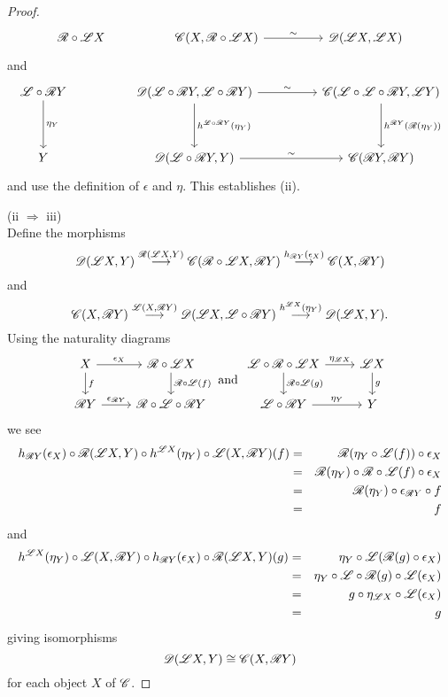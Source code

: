 \documentclass[10pt]{amsart}
\begin{document}
\begin{prop}
\begin{proof}
$$\begin{tikzcd}
      \RA \circ \LA X & & \C(X, \RA \circ \LA X) \arrow{rr}{\sim} & & \D(\LA X, \LA X)
    \end{tikzcd}$$
    and
    $$\begin{tikzcd}
      \LA \circ \RA Y \arrow{dd}{\eta_Y} & & \D(\LA \circ \RA Y, \LA \circ \RA Y) \arrow{rr}{\sim}\arrow{dd}{h^{\LA \circ \RA Y}(\eta_Y)} & & \C(\LA \circ \LA \circ \RA Y, \LA Y) \arrow{dd}{h^{\RA Y}(\RA(\eta_Y))}\\
      \\
      Y & & \D(\LA \circ \RA Y, Y) \arrow{rr}{\sim}  & & \C(\RA Y, \RA Y)
    \end{tikzcd}$$
    and use the definition of $\epsilon$ and $\eta$.
    This establishes (ii).
    
    (ii $\Rightarrow$ iii)\\
    Define the morphisms
    $$\mathscr{D}(\mathscr{L} X, Y) \overset{\mathscr{R}(\mathscr{L} X, Y)}\longrightarrow \mathscr{C}(\mathscr{R} \circ \mathscr{L} X, \mathscr{R} Y) \overset{h_{\mathscr{R} Y}(\epsilon_X)}\longrightarrow \mathscr{C}(X, \mathscr{R} Y)$$
    and
    $$\mathscr{C}(X, \mathscr{R} Y) \overset{\mathscr{L}(X, \mathscr{R} Y)}\longrightarrow \mathscr{D}(\mathscr{L} X, \mathscr{L} \circ \mathscr{R} Y) \overset{h^{\mathscr{L} X}(\eta_Y)}\longrightarrow \mathscr{D}(\mathscr{L} X, Y).$$
    Using the naturality diagrams
    $$\begin{tikzcd}
      X \arrow{r}{\epsilon_X}\arrow{d}{f} & \RA \circ \LA X \arrow{d}{\RA \circ \LA(f)}\\
      \RA Y \arrow{r}{\epsilon_{\RA Y}} & \RA \circ \LA \circ \RA Y
    \end{tikzcd}
    \ \text{and}\ 
    \begin{tikzcd}
      \LA \circ \RA \circ \LA X \arrow{r}{\eta_{\LA X}}\arrow{d}{\RA \circ \LA(g)} & \LA X \arrow{d}{g}\\
      \LA \circ \RA Y \arrow{r}{\eta_Y} & Y
    \end{tikzcd}$$
    we see
    \begin{eqnarray*}
      h_{\mathscr{R} Y}(\epsilon_X) \circ \mathscr{R}(\mathscr{L} X, Y) \circ h^{\mathscr{L} X}(\eta_Y) \circ \mathscr{L}(X, \mathscr{R} Y)(f) &=& \mathscr{R}(\eta_Y \circ \mathscr{L}(f)) \circ \epsilon_X\\
      &=& \mathscr{R}(\eta_Y) \circ \mathscr{R} \circ \mathscr{L}(f) \circ \epsilon_X\\
      &=& \mathscr{R}(\eta_Y) \circ \epsilon_{\mathscr{R} Y} \circ f\\
      &=& f
    \end{eqnarray*}
    and
    \begin{eqnarray*}
      h^{\mathscr{L} X}(\eta_Y) \circ \mathscr{L}(X, \mathscr{R} Y) \circ h_{\mathscr{R} Y}(\epsilon_X) \circ \mathscr{R}(\mathscr{L} X, Y)(g) &=& \eta_Y \circ \mathscr{L}(\mathscr{R}(g) \circ \epsilon_X)\\
      &=& \eta_Y \circ \mathscr{L} \circ \mathscr{R}(g) \circ \mathscr{L}(\epsilon_X)\\
      &=& g \circ \eta_{\mathscr{L} X} \circ \mathscr{L}(\epsilon_X)\\
      &=& g
    \end{eqnarray*}
    giving isomorphisms
    $$\mathscr{D}(\mathscr{L} X, Y) \cong \mathscr{C}(X, \mathscr{R} Y)$$
    for each object $X$ of $\mathscr{C}$.
    

\end{proof}
\end{prop}
\end{document}
